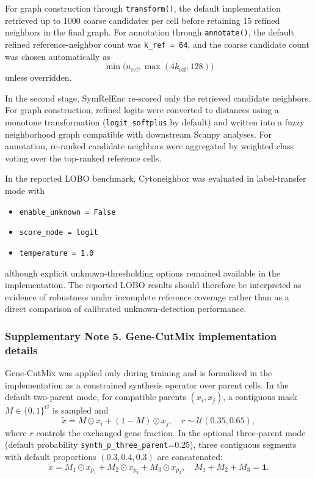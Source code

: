 \documentclass[11pt]{article}
\begin{document}
For graph construction through \texttt{transform()}, the default implementation retrieved up to 1000 coarse candidates per cell before retaining 15 refined neighbors in the final graph. For annotation through \texttt{annotate()}, the default refined reference-neighbor count was \texttt{k\_ref = 64}, and the coarse candidate count was chosen automatically as
\[
\min\!\bigl(n_{\mathrm{ref}}, \max(4k_{\mathrm{ref}}, 128)\bigr)
\]
unless overridden.

In the second stage, SymRelEnc re-scored only the retrieved candidate neighbors. For graph construction, refined logits were converted to distances using a monotone transformation (\texttt{logit\_softplus} by default) and written into a fuzzy neighborhood graph compatible with downstream Scanpy analyses. For annotation, re-ranked candidate neighbors were aggregated by weighted class voting over the top-ranked reference cells.

In the reported LOBO benchmark, Cytoneighbor was evaluated in label-transfer mode with
\begin{itemize}
    \item \texttt{enable\_unknown = False}
    \item \texttt{score\_mode = logit}
    \item \texttt{temperature = 1.0}
\end{itemize}
although explicit unknown-thresholding options remained available in the implementation. The reported LOBO results should therefore be interpreted as evidence of robustness under incomplete reference coverage rather than as a direct comparison of calibrated unknown-detection performance.

\subsubsection*{Supplementary Note 5. Gene-CutMix implementation details}

Gene-CutMix was applied only during training and is formalized in the implementation as a constrained synthesis operator over parent cells. In the default two-parent mode, for compatible parents $(x_i, x_j)$, a contiguous mask $M \in \{0,1\}^G$ is sampled and
\[
\tilde{x}=M\odot x_i + (1-M)\odot x_j,\quad r\sim \mathcal{U}(0.35,0.65),
\]
where $r$ controls the exchanged gene fraction. In the optional three-parent mode (default probability \texttt{synth\_p\_three\_parent}=0.25), three contiguous segments with default proportions $(0.3,0.4,0.3)$ are concatenated:
\[
\tilde{x}=M_1\odot x_{p_1}+M_2\odot x_{p_2}+M_3\odot x_{p_3},\quad M_1+M_2+M_3=\mathbf{1}.
\]
\end{document}
